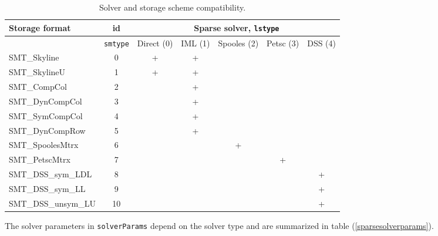 \documentclass[a4paper]{article}
\newcommand{\param}[1]{\texttt{#1}} %
\begin{document}
\begin{table}[ht]
\begin{center}
\begin{tabular}{|l|c|c|c|c|c|c|}
\hline
Storage format & id & \multicolumn{5}{c|}{Sparse solver, \param{lstype}} \\
\hline
& \param{smtype} & \tiny{Direct (0)} &\tiny{IML (1)}
 &\tiny{Spooles (2)}& \tiny{Petsc (3)}& \tiny{DSS (4)}\\
\hline
\small{SMT\_Skyline}       & 0&+&+& & & \\
\small{SMT\_SkylineU}      & 1&+&+& & & \\
\small{SMT\_CompCol}       & 2& &+& & & \\
\small{SMT\_DynCompCol}    & 3& &+& & & \\
\small{SMT\_SymCompCol}    & 4& &+& & & \\
\small{SMT\_DynCompRow}    & 5& &+& & & \\
\small{SMT\_SpoolesMtrx}   & 6& & &+& & \\
\small{SMT\_PetscMtrx }    & 7& & & &+& \\
\small{SMT\_DSS\_sym\_LDL} & 8& & & & &+\\
\small{SMT\_DSS\_sym\_LL}  & 9& & & & &+\\
\small{SMT\_DSS\_unsym\_LU}&10& & & & &+\\
\hline
\end{tabular}
\caption{Solver and storage scheme compatibility.}
\label{linsolvstoragecompattable}
\end{center}
\end{table}

The solver parameters in \param{solverParams} depend on the solver
type and are summarized in table (\ref{sparsesolverparams}).
\end{document}
